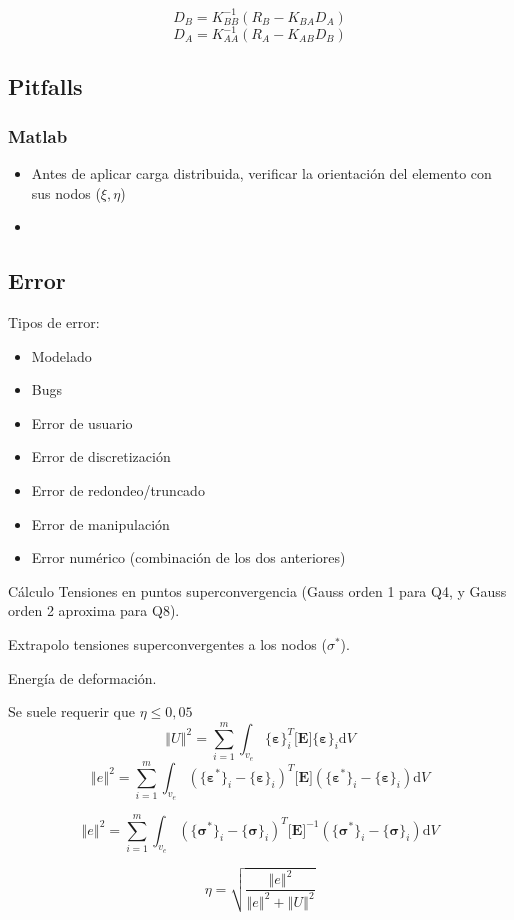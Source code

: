 \documentclass[draft,11pt, a4paper,titlepage]{article}
\newcommand{\rmfont}[1]{{\fontfamily{ptm}\selectfont%
#1}}
\newcommand{\vvert}[1]{\left\Vert #1\right\Vert}
\newcommand{\Matlab}{\rmfont{\sc Matlab}}
\newcommand{\di}{\textrm{d}}
\newcommand{\sigmab}{\boldsymbol{\sigma}}
\newcommand{\varepsilonb}{\boldsymbol{\varepsilon}}
\newcommand{\Mme}[1]{\boldsymbol{[}\mathbf{#1} \boldsymbol{]}}
\newcommand{\Cme}[1]{\boldsymbol{\{ }\mathbf{#1} \boldsymbol{\}} }
\newcommand{\ME}{\Mme{E}}
\begin{document}
\[ 
D_B = K_{BB}^{-1} (R_B - K_{BA}D_A)
\]
\[
D_A =K_{AA}^{-1}(R_A-K_{AB}D_B)
\]

\subsection{Pitfalls}
\subsubsection*{\Matlab{}}
\begin{itemize}
    \item Antes de aplicar carga distribuida, verificar la orientación del elemento con sus nodos ($\xi,\eta$)
    \item
\end{itemize}
\subsection{Error}
Tipos de error:
\begin{itemize}
    \item Modelado
    \item Bugs
    \item Error de usuario
    \item Error de discretización
    \item Error de redondeo/truncado
    \item Error de manipulación 
    \item Error numérico (combinación de los dos anteriores)
\end{itemize}

Cálculo Tensiones en puntos superconvergencia (Gauss orden 1 para Q4, y Gauss orden 2 aproxima para Q8).

Extrapolo tensiones superconvergentes a los nodos ($\sigma^*$).

Energía de deformación.

Se suele requerir que $\eta\leq 0,05$
\[
\vvert{U}^2 = \sum^m_{i=1}\int_{v_e} \Cme{\varepsilonb}_i^T \ME \Cme{\varepsilonb}_i \di V
\]
\[
\vvert{e}^2=\sum_{i=1}^m \int_{v_e} \left( \Cme{\varepsilonb^*}_i - \Cme{\varepsilonb}_i\right)^T \ME \left( \Cme{\varepsilonb^*}_i - \Cme{\varepsilonb}_i\right) \di V
\]

\[
\vvert{e}^2=\sum_{i=1}^m \int_{v_e} \left( \Cme{\sigmab^*}_i - \Cme{\sigmab}_i\right)^T \ME ^{-1} \left( \Cme{\sigmab^*}_i - \Cme{\sigmab}_i\right) \di V
\]

\[
\eta = \sqrt{\frac{\vvert{e}^2}{\vvert{e}^2+\vvert{U}^2}}
\]
\end{document}
